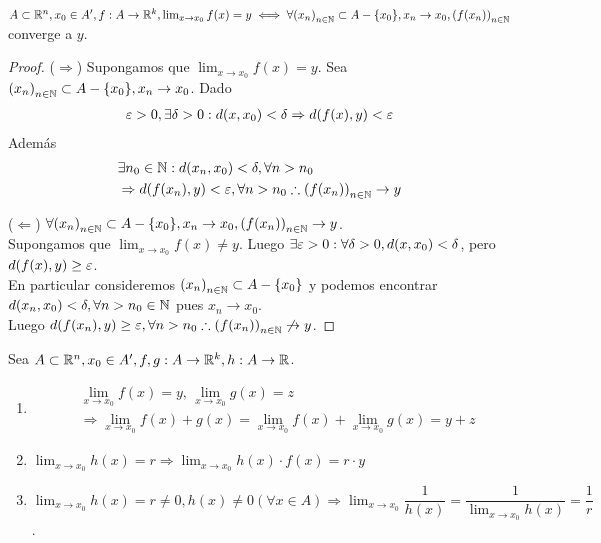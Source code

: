 \begin{prop}
  \(A \subset \mathbb{R}^n, x_0 \in A^{\prime}, f: A \to \mathbb{R}^k, \lim_{x \to x_0} f(x) = y \iff \forall {(x_n)}_{n \in \mathbb{N}} \subset A - \{x_0\}, x_n \to x_0, {(f(x_n))}_{n \in \mathbb{N}} \) converge a \(y\).
  \begin{proof}
    (\(\Rightarrow \)) Supongamos que \(\lim_{x \to x_0} f(x) = y\). Sea \({(x_n)}_{n \in \mathbb{N}} \subset A - \{x_0\}, x_n \to x_0\). Dado \begin{align*}
      \varepsilon > 0, \exists \delta > 0 : d(x, x_0) < \delta \Rightarrow d(f(x), y) < \varepsilon
    \end{align*} Además \begin{align*}
       & \exists n_0 \in \mathbb{N} : d(x_n, x_0) < \delta, \forall n > n_0                          \\
       & \Rightarrow d(f(x_n), y) < \varepsilon, \forall n > n_0 \therefore {(f(x_n))}_{n \in \mathbb{N}} \to y
    \end{align*}

    (\(\Leftarrow \)) \(\forall {(x_n)}_{n \in \mathbb{N}} \subset A - \{x_0\}, x_n \to x_0, {(f(x_n))}_{n \in \mathbb{N}} \to y\). \\
    Supongamos que \(\lim_{x \to x_0} f(x) \neq y\). Luego \(\exists \varepsilon > 0 : \forall \delta > 0, d(x, x_0) < \delta \), pero \(d(f(x), y) \geq \varepsilon \). \\
    En particular consideremos \({(x_n)}_{n \in \mathbb{N}} \subset A - \{x_0\} \) y podemos encontrar \(d(x_n, x_0) < \delta, \forall n > n_0 \in \mathbb{N} \) pues \(x_n \to x_0\). \\
    Luego \(d(f(x_n), y) \geq \varepsilon, \forall n > n_0 \therefore {(f(x_n))}_{n \in \mathbb{N}} \not \to y\).
  \end{proof}
\end{prop}

\begin{prop}
  Sea \(A \subset \mathbb{R}^n, x_0 \in A^{\prime}, f, g: A \to \mathbb{R}^k, h: A \to \mathbb{R} \).
  \begin{enumerate}
    \item \begin{align*}
             & \lim_{x \to x_0} f(x) = y\text{, } \lim_{x \to x_0} g(x) = z                                   \\
             & \Rightarrow \lim_{x \to x_0} f(x) + g(x) = \lim_{x \to x_0} f(x) + \lim_{x \to x_0} g(x) = y+z
          \end{align*}
    \item \(\lim_{x \to x_0} h(x) = r \Rightarrow \lim_{x \to x_0} h(x) \cdot f(x) = r \cdot y\)
    \item \(\lim_{x \to x_0} h(x) = r \neq 0, h(x) \neq 0 (\forall x \in A) \Rightarrow \lim_{x \to x_0} \dfrac{1}{h(x)} = \dfrac{1}{\lim_{x \to x_0} h(x)} = \dfrac{1}{r} \).
  \end{enumerate}
\end{prop}

